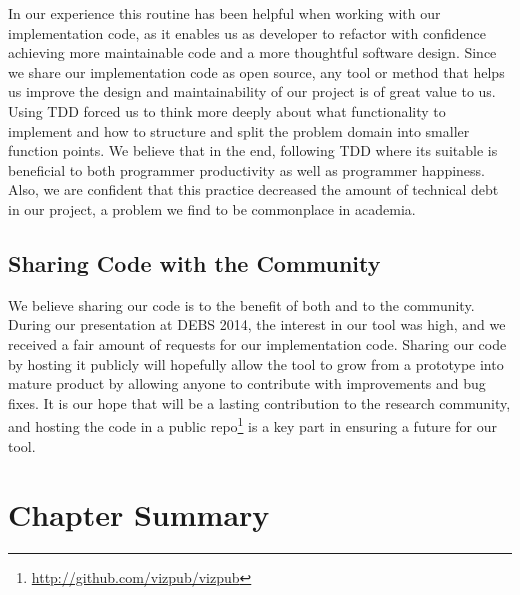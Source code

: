 In our experience this routine has been helpful when working
with our implementation code, as it enables us as developer to
refactor with confidence achieving more maintainable code and a
more thoughtful software design. Since we share our
implementation code as open source, any tool or method that helps us improve the
design and maintainability of our project is of great value to
us. Using TDD forced us to think more deeply about what
functionality to implement and how to structure and split the
problem domain into smaller function points. We believe that in
the end, following TDD where its suitable is beneficial to both
programmer productivity as well as programmer happiness. Also,
we are confident that this practice decreased the amount of
technical debt in our project, a problem we find to be commonplace in academia.

\subsection{Sharing Code with the Community}

We believe sharing our code is to the benefit of both \demo{} and to the
community. During our presentation at DEBS 2014, the interest in our
tool was high, and we received a fair amount of requests for our
implementation code. Sharing our code by hosting it publicly will
hopefully allow the tool to grow from a prototype into mature product by
allowing anyone to contribute with improvements and bug fixes. It is our
hope that \demo{} will be a lasting contribution to the research
community, and hosting the code in a public
repo\footnote{\url{http://github.com/vizpub/vizpub}} is a key part in
ensuring a future for our tool.

\section{Chapter Summary}

